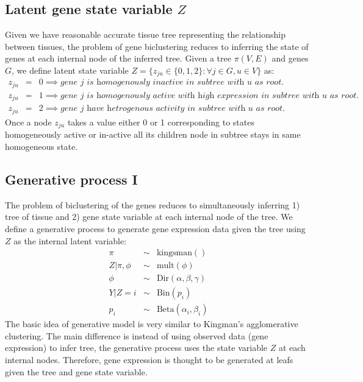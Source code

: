 \documentclass{article}
\begin{document}
\subsection{Latent gene state variable $Z$}
Given we have reasonable accurate tissue tree representing the relationship between tissues,
the problem of gene biclustering reduces to inferring the 
state of genes at each internal node of the inferred tree. 
Given a tree $\pi(V,E)$ and genes $G$, we define latent state variable $Z= \{z_{ju} \in\{0,1,2\} : \forall j \in G, u \in V\}$ as:
\begin{eqnarray}
	z_{ju} &=& 0 \implies \textit{gene $j$ is homogenously inactive in subtree with $u$ as root.} \nonumber\\ 
	z_{ju} &=& 1 \implies \textit{gene $j$ is homogenously active with high expression in subtree with  $u$ as root.} \nonumber \\
	z_{ju} &=& 2 \implies \textit{gene $j$ have hetrogenous activity in subtree with $u$ as root.} \nonumber 
\end{eqnarray}
Once a node $z_{ju}$ takes a value either 0 or 1 corresponding to states  
homogeneously active or in-active all its children node in subtree stays in same homogeneous state.

\subsection{Generative process I}
The problem of biclustering of the genes 
reduces to simultaneously inferring 1) tree of tissue and 2) gene state variable at each internal node of the tree.
We define a generative process to generate gene expression data given the tree using $Z$ as the internal latent variable:
\begin{eqnarray}
	\pi &\sim& \text{kingsman}() \nonumber\\
	Z|\pi,\phi &\sim& \text{mult}(\phi) \nonumber \\
	\phi &\sim&  \text{Dir}(\alpha,\beta,\gamma) \nonumber\\
	Y|Z = i &\sim& \text{Bin}(p_i) \nonumber \\
	p_i &\sim&  \text{Beta}(\alpha_i,  \beta_i)
	\label{eqn:gen1}
\end{eqnarray}
The basic idea of generative model is very similar to Kingman's agglomerative clustering. The main difference is instead of using 
observed data (gene expression) to infer tree, the generative process uses the state variable $Z$ at each internal nodes. 
Therefore, gene expression is thought to be generated at leafs given the tree and gene state variable.
\end{document}
